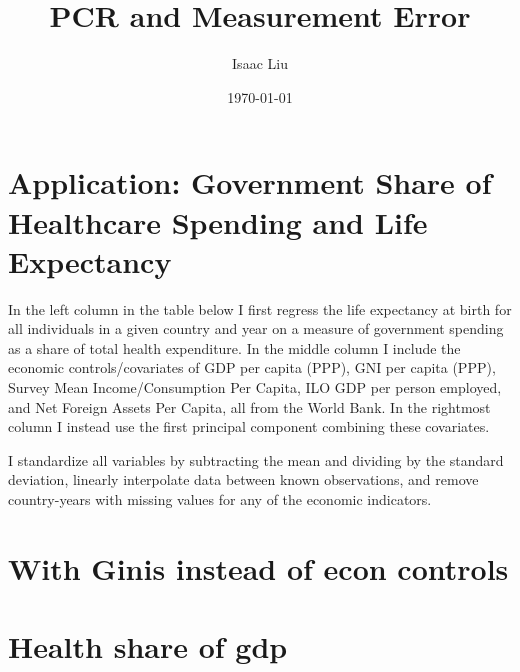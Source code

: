 \documentclass{report}
\title{PCR and Measurement Error}
\author{Isaac Liu}
\date{\today}
\begin{document}
	\maketitle

	\newpage \clearpage

    \section*{Application: Government Share of Healthcare Spending and Life Expectancy}

	In the left column in the table below I first regress the life expectancy at birth for all individuals in a given country and year on a measure of government spending as a share of total health expenditure. In the middle column I include the economic controls/covariates of GDP per capita (PPP), GNI per capita (PPP), Survey Mean Income/Consumption Per Capita, ILO GDP per person employed, and Net Foreign Assets Per Capita, all from the World Bank. In the rightmost column I instead use the first principal component combining these covariates.
	
	I standardize all variables by subtracting the mean and dividing by the standard deviation, linearly interpolate data between known observations, and remove country-years with missing values for any of the economic indicators.

    



	

	\newpage \clearpage

    \section*{With Ginis instead of econ controls}

	

	\newpage \clearpage

    \section*{Health share of gdp}
\end{document}
